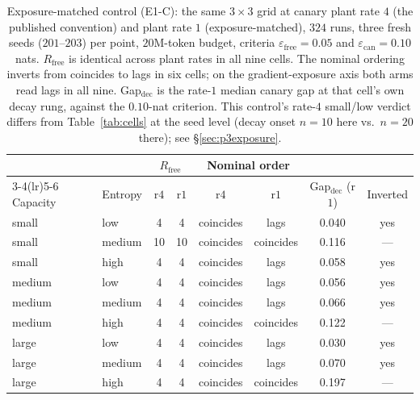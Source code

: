 \documentclass[11pt]{article}
\begin{document}
\begin{table}[htbp]
\centering
\caption{Exposure-matched control (E1-C): the same $3\times3$ grid at canary plant
rate $4$ (the published convention) and plant rate $1$ (exposure-matched), $324$
runs, three fresh seeds ($201$--$203$) per point, $20$M-token budget, criteria
$\varepsilon_{\mathrm{free}}=0.05$ and $\varepsilon_{\mathrm{can}}=0.10$ nats.
$R_{\mathrm{free}}$ is identical across plant rates in all nine cells. The nominal
ordering inverts from coincides to lags in six cells; on the gradient-exposure axis
both arms read lags in all nine. Gap$_{\mathrm{dec}}$ is the rate-$1$ median canary
gap at that cell's own decay rung, against the $0.10$-nat criterion. This control's
rate-$4$ small/low verdict differs from Table~\ref{tab:cells} at the seed level
(decay onset $n{=}10$ here vs.\ $n{=}20$ there); see \S\ref{sec:p3exposure}.}
\label{tab:exposure}
\scriptsize
\begin{tabular}{@{}llcccccc@{}}
\toprule
& & \multicolumn{2}{c}{$R_{\mathrm{free}}$} & \multicolumn{2}{c}{Nominal order} & & \\
\cmidrule(lr){3-4}\cmidrule(lr){5-6}
Capacity & Entropy & r$4$ & r$1$ & r$4$ & r$1$ & Gap$_{\mathrm{dec}}$ (r$1$) & Inverted \\
\midrule
small & low    & 4  & 4  & coincides & lags      & 0.040 & yes \\
small & medium & 10 & 10 & coincides & coincides & 0.116 & --- \\
small & high   & 4  & 4  & coincides & lags      & 0.058 & yes \\
\midrule
medium & low    & 4 & 4 & coincides & lags      & 0.056 & yes \\
medium & medium & 4 & 4 & coincides & lags      & 0.066 & yes \\
medium & high   & 4 & 4 & coincides & coincides & 0.122 & --- \\
\midrule
large & low    & 4 & 4 & coincides & lags      & 0.030 & yes \\
large & medium & 4 & 4 & coincides & lags      & 0.070 & yes \\
large & high   & 4 & 4 & coincides & coincides & 0.197 & --- \\
\bottomrule
\end{tabular}
\end{table}
\end{document}
